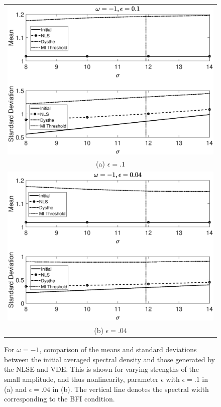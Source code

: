 \documentclass[a4paper,11pt]{article}
\begin{document}
\begin{figure}[!ht]
\centering
\begin{tabular}{c}
\includegraphics[width=.85\textwidth]{omega_n1_ep0pt1_dt5en4}\\
(a) $\epsilon=.1$ \\
\includegraphics[width=.85\textwidth]{omega_n1_ep0pt04}\\
(b) $\epsilon=.04$
\end{tabular}
\caption{For $\omega=-1$, comparison of the means and standard deviations between the initial averaged spectral density and those generated by the NLSE and VDE.  This is shown for varying strengths of the small amplitude, and thus nonlinearity, parameter $\epsilon$ with $\epsilon=.1$ in (a) and $\epsilon=.04$ in (b).  The vertical line denotes the spectral width corresponding to the BFI condition.}
\label{fig:meanstdomn1}
\end{figure}
\end{document}
